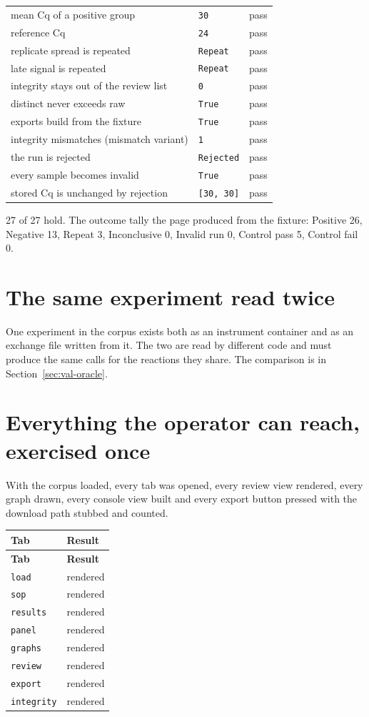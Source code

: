 {\begin{xltabular}{\linewidth}{|X|l|l|}
mean Cq of a positive group & \texttt{30} & pass \\
reference Cq & \texttt{24} & pass \\
replicate spread is repeated & \texttt{Repeat} & pass \\
late signal is repeated & \texttt{Repeat} & pass \\
integrity stays out of the review list & \texttt{0} & pass \\
distinct never exceeds raw & \texttt{True} & pass \\
exports build from the fixture & \texttt{True} & pass \\
integrity mismatches (mismatch variant) & \texttt{1} & pass \\
the run is rejected & \texttt{Rejected} & pass \\
every sample becomes invalid & \texttt{True} & pass \\
stored Cq is unchanged by rejection & \texttt{[30, 30]} & pass \\
\bottomrule
\end{xltabular}}

\par 27 of 27 hold. The outcome tally the page produced from the fixture: Positive 26, Negative 13, Repeat 3, Inconclusive 0, Invalid run 0, Control pass 5, Control fail 0.


\section{The same experiment read twice}
One experiment in the corpus exists both as an instrument container and as an
exchange file written from it. The two are read by different code and must produce
the same calls for the reactions they share. The comparison is in
Section~\ref{sec:val-oracle}.

\section{Everything the operator can reach, exercised once}
With the corpus loaded, every tab was opened, every review view rendered, every
graph drawn, every console view built and every export button pressed with the
download path stubbed and counted.

{\small
\begin{xltabular}{\linewidth}{|X|l|}
\toprule \textbf{Tab} & \textbf{Result} \\\midrule\endfirsthead
\toprule \textbf{Tab} & \textbf{Result} \\\midrule\endhead
\texttt{load} & rendered \\
\texttt{sop} & rendered \\
\texttt{results} & rendered \\
\texttt{panel} & rendered \\
\texttt{graphs} & rendered \\
\texttt{review} & rendered \\
\texttt{export} & rendered \\
\texttt{integrity} & rendered \\
\bottomrule
\end{xltabular}}

